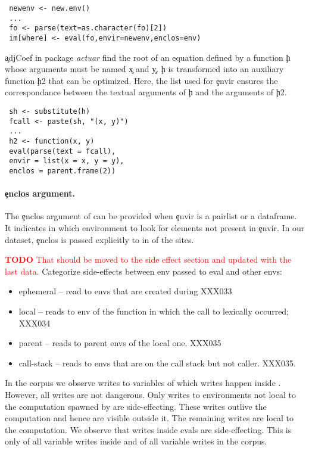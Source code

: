 \documentclass[screen,acmsmall]{acmart}
\newcommand{\authorcomment}[3]{\xspace\textcolor{#1}{{\bf #2} #3}\xspace}
\newcommand{\todo}[1]{\authorcomment{red}{TODO}{#1}}
\begin{document}
\begin{lstlisting}
 newenv <- new.env()
 ...
 fo <- parse(text=as.character(fo)[2])
 im[where] <- eval(fo,envir=newenv,enclos=env)
\end{lstlisting}

\c{adjCoef} in package \emph{actuar} find the root of an equation defined by a
function \c{h} whose arguments must be named \c{x} and \c{y}. \c{h} is
transformed into an auxiliary function \c{h2} that can be optimized. Here, the
list used for \c{envir} ensures the correspondance between the textual arguments
of \c{h} and the arguments of \c{h2}.

\begin{lstlisting}
 sh <- substitute(h)
 fcall <- paste(sh, "(x, y)")
 ...
 h2 <- function(x, y)
 eval(parse(text = fcall),
 envir = list(x = x, y = y),
 enclos = parent.frame(2))
\end{lstlisting}


\paragraph{\c{enclos} argument.} The \c{enclos} argument of \eval can be provided when \c{envir} is a pairlist or a dataframe. It indicates in which environment to look for elements not present in \c{envir}. In our dataset, \c{enclos} is passed explicitly to \eval in \packageEnclosSitePercent of the sites.


\todo{That should be moved to the side effect section and updated with the last data.}
Categorize side-effects between env passed to eval and other envs:
\begin{itemize}
\item ephemeral -- read to envs that are created during \eval  XXX033
\item local -- reads to env of the function in which the call to \eval
  lexically occurred; XXX034
\item parent -- reads to parent envs of the local one. XXX035
\item call-stack -- reads to envs that are on the call stack but not
  caller. XXX035.
\end{itemize}

In the corpus we observe \AllWritesRnd writes to variables of which
\EvalWritesRnd writes happen inside \eval. However, all writes are not
dangerous. Only writes to environments not local to the computation spawned by
\eval are side-effecting. These writes outlive the computation and hence are
visible outside it. The remaining writes are local to the computation. We
observe that \EvalSideEffectingWritesRnd writes inside evals are side-effecting.
This is only \EvalSideEffectingWritesEvalPerc of all variable writes inside
\eval and \EvalSideEffectingWritesAllPerc of all variable writes in the corpus.
\end{document}
